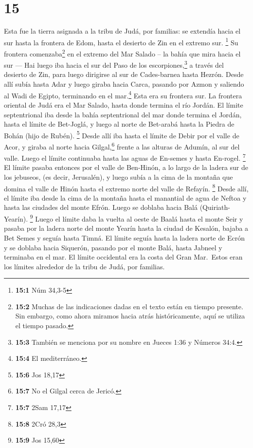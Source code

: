 \hypertarget{section-14}{%
\section{15}\label{section-14}}

 Esta fue la tierra asignada a la tribu de Judá, por
familias: se extendía hacia el sur hasta la frontera de Edom, hasta el
desierto de Zin en el extremo sur. \footnote{\textbf{15:1} Núm 34,3-5}
 Su frontera comenzaba\footnote{\textbf{15:2} Muchas de
  las indicaciones dadas en el texto están en tiempo presente. Sin
  embargo, como ahora miramos hacia atrás históricamente, aquí se
  utiliza el tiempo pasado.} en el extremo del Mar Salado -- la bahía
que mira hacia el sur ---  Hai luego iba hacia el sur del
Paso de los escorpiones,\footnote{\textbf{15:3} También se menciona por
  su nombre en Jueces 1:36 y Números 34:4.} a través del desierto de
Zin, para luego dirigirse al sur de Cades-barnea hasta Hezrón. Desde
allí subía hasta Adar y luego giraba hacia Carca,  pasando
por Azmon y saliendo al Wadi de Egipto, terminando en el mar.\footnote{\textbf{15:4}
  El mediterráneo.} Esta era su frontera sur.  La frontera
oriental de Judá era el Mar Salado, hasta donde termina el río Jordán.
El límite septentrional iba desde la bahía septentrional del mar donde
termina el Jordán,  hasta el límite de Bet-Joglá, y luego
al norte de Bet-arabá hasta la Piedra de Bohán (hijo de Rubén).
\footnote{\textbf{15:6} Jos 18,17}  Desde allí iba hasta
el límite de Debir por el valle de Acor, y giraba al norte hacia
Gilgal,\footnote{\textbf{15:7} No el Gilgal cerca de Jericó.} frente a
las alturas de Adumín, al sur del valle. Luego el límite continuaba
hasta las aguas de En-semes y hasta En-rogel. \footnote{\textbf{15:7}
  2Sam 17,17}  El límite pasaba entonces por el valle de
Ben-Hinón, a lo largo de la ladera sur de los jebuseos, (es decir,
Jerusalén), y luego subía a la cima de la montaña que domina el valle de
Hinón hasta el extremo norte del valle de Refayín. \footnote{\textbf{15:8}
  2Cró 28,3}  Desde allí, el límite iba desde la cima de
la montaña hasta el manantial de agua de Neftoa y hasta las ciudades del
monte Efrón. Luego se doblaba hacia Balá (Quiriath-Yearín). \footnote{\textbf{15:9}
  Jos 15,60}  Luego el límite daba la vuelta al oeste de
Baalá hasta el monte Seir y pasaba por la ladera norte del monte Yearín
hasta la ciudad de Kesalón, bajaba a Bet Semes y seguía hasta Timná.
 El límite seguía hasta la ladera norte de Ecrón y se
doblaba hacia Siquerón, pasando por el monte Balá, hasta Jabneel y
terminaba en el mar.  El límite occidental era la costa
del Gran Mar.~Estos eran los límites alrededor de la tribu de Judá, por
familias.

